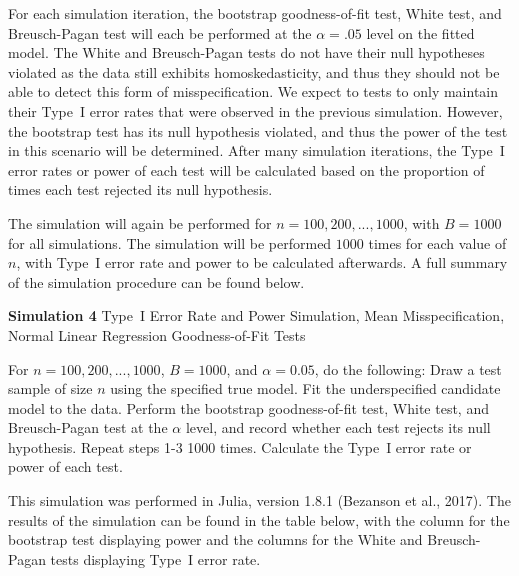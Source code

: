 		For each simulation iteration, the bootstrap goodness-of-fit test, White test, and Breusch-Pagan test will each be performed at the $\alpha = .05$ level on the 
		fitted model. The White and Breusch-Pagan tests do not have their null hypotheses violated as the data still exhibits homoskedasticity, and thus they should not be able to
		detect this form of misspecification. We expect to tests to only maintain their Type~I error rates that were observed in the previous simulation. However, the bootstrap test has its null hypothesis violated,
		and thus the power of the test in this scenario will be determined. After many simulation iterations, the Type~I error rates or power of each test
		will be calculated based on the proportion of times each test rejected its null hypothesis.

		The simulation will again be performed for $n = 100,200,...,1000$, with $B = 1000$ for all simulations. The simulation will be performed $1000$ times for each value of $n$, with
		Type~I error rate and power to be calculated afterwards. A full summary of the simulation procedure can be found below.
		\begin{algorithm}[H]
			\caption*{\textbf{Simulation 4} Type~I Error Rate and Power Simulation, Mean Misspecification, Normal Linear Regression Goodness-of-Fit Tests}
			\begin{algorithmic}[1]
			  \Statex For $n = 100,200,...,1000$, $B = 1000$, and $\alpha = 0.05$, do the following:
			  \State Draw a test sample of size $n$ using the specified true model.
			  \State Fit the underspecified candidate model to the data.
			  \State Perform the bootstrap goodness-of-fit test, White test, and Breusch-Pagan test at the $\alpha$ level,
			  and record whether each test rejects its null hypothesis.
			  \State Repeat steps 1-3 1000 times.
			  \State Calculate the Type~I error rate or power of each test.
			\end{algorithmic}
		\end{algorithm}

		This simulation was performed in Julia, version 1.8.1 (Bezanson et al., 2017). The results of the simulation can be found in the table below, with the column for the
		bootstrap test displaying power and the columns for the White and Breusch-Pagan tests displaying Type~I error rate.

